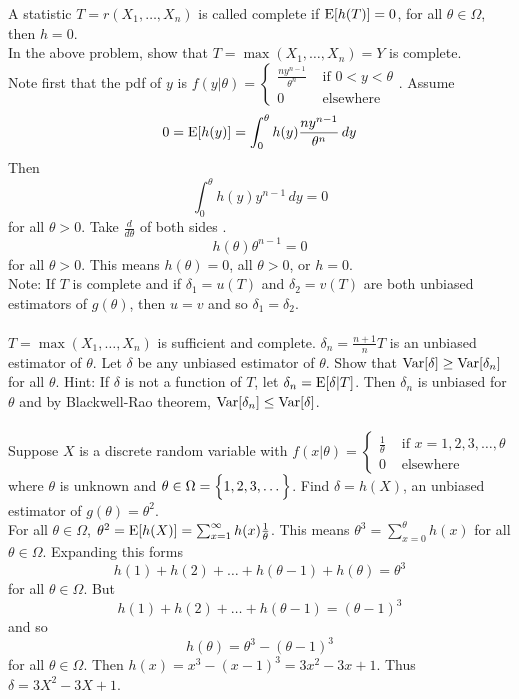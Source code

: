 \documentclass[12pt]{article}
\begin{document}
A statistic $T = r(X_1,\dots,X_n)$ is called complete if $\mathrm{E}[ h(T) ] = 0$, for all $\theta \in \Omega$, then $h = 0$. \\
In the above problem, show that $T = \max(X_1,\dots,X_n) = Y$ is complete. \\
Note first that the pdf of $y$ is $f(y | \theta) = \begin{cases} \frac{ny^{n-1}}{\theta^n} &\text{ if } 0 < y < \theta \\ 0 &\text{ elsewhere } \end{cases} $. Assume $$ 0 = \mathrm{E}[ h(y) ] = \int_0^\theta h(y) \frac{ny^{n-1}}{\theta^{n}} \, dy $$ Then $$ \int_0^\theta h(y) y^{n-1} \, dy = 0$$ for all $\theta > 0$. Take $\frac{d}{d\theta}$ of both sides . $$h(\theta) \theta^{n-1} = 0$$ for all $\theta > 0$. This means $h(\theta) = 0$, all $\theta > 0$, or $h = 0$. \\
Note: If $T$ is complete and if $\delta_1 = u(T)$ and $\delta_2 = v(T)$ are both unbiased estimators of $g(\theta)$, then $u=v$ and so $\delta_1 = \delta_2$. \\~\\
$T = \max(X_1,\dots,X_n)$ is sufficient and complete. $\delta_n = \frac{n+1}{n}T$ is an unbiased estimator of $\theta$. Let $\delta$ be any unbiased estimator of $\theta$. Show that $\mathrm{Var}[ \delta ] \geq \mathrm{Var}[ \delta_n ]$ for all $\theta$. Hint: If $\delta$ is not a function of $T$, let $\delta_n = \mathrm{E}[ \delta | T ]$. Then $\delta_n$ is unbiased for $\theta$ and by Blackwell-Rao theorem, $\mathrm{Var}[ \delta_n ] \leq \mathrm{Var}[ \delta ]$. \\~\\
Suppose $X$ is a discrete random variable with $f(x|\theta) = \begin{cases} \frac{1}{\theta} &\text{ if } x = 1,2,3,\dots,\theta \\ 0 &\text{ elsewhere } \end{cases}$ where $\theta$ is unknown and $\theta \in \Omega = \Big\{ 1,2,3,\dots \Big\}$. Find $\delta = h(X)$, an unbiased estimator of $g(\theta) = \theta^2$. \\
For all $\theta \in \Omega$, $ \theta^2 = \mathrm{E}[ h(X) ] = \sum_{x=1}^\infty h(x) \frac{1}{\theta}$. This means $\theta^3 = \sum_{x=0}^\theta h(x)$ for all $\theta \in \Omega$. Expanding this forms $$ h(1) + h(2) + \dots + h(\theta - 1) + h(\theta) = \theta^3$$ for all $\theta \in \Omega$. But $$ h(1) + h(2) + \dots + h(\theta-1) = (\theta-1)^3$$ and so $$h(\theta) = \theta^3 - (\theta-1)^3$$ for all $\theta \in \Omega$. Then $h(x) = x^3 - (x-1)^3 = 3x^2 - 3x + 1$. Thus $\delta = 3X^2 - 3X + 1$. \\~\\
\end{document}
